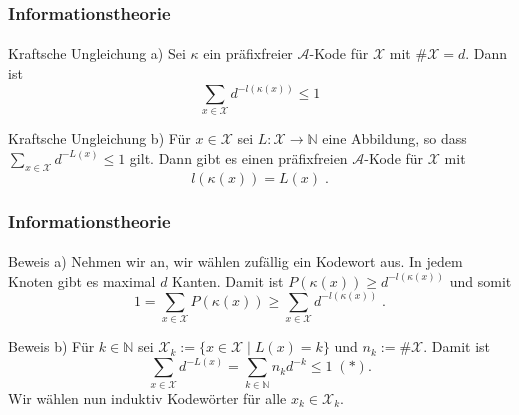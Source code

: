 \documentclass{beamer}
\begin{document}
\begin{frame}
    \frametitle{Informationstheorie}
\framesubtitle{}

\begin{block}{Kraftsche Ungleichung a)}
Sei $\kappa$ ein präfixfreier $\mathcal{A}$-Kode für $\mathcal{X}$ mit $\# \mathcal{X} = d$. Dann ist
$$ \sum_{x \in \mathcal{X} }  d^{-l( \kappa(x))} \leq 1$$
\end{block}

\begin{block}{Kraftsche Ungleichung b)}
Für $x \in \mathcal{X}$ sei $L : \mathcal{X} \to \mathbb{N}$ eine Abbildung, so dass $ \sum_{x \in \mathcal{X} }  d^{-L(x)} \leq 1$ gilt. Dann gibt es einen präfixfreien  $\mathcal{A}$-Kode für $\mathcal{X}$ mit 
$$ l(\kappa(x)) = L(x) \; .$$
\end{block}


 \end{frame}

\begin{frame}
    \frametitle{Informationstheorie}
\framesubtitle{}

\begin{block}{Beweis a)}
Nehmen wir an, wir wählen zufällig ein Kodewort aus.
In jedem Knoten gibt es maximal $d$ Kanten. Damit ist $P(\kappa(x)) \geq d^{-l(\kappa(x))}$ und somit
$$ 1 = \sum_{x \in \mathcal{X}} P(\kappa(x)) \geq  \sum_{x \in \mathcal{X}} d^{-l(\kappa(x))} \; .$$
\end{block}

\begin{block}{Beweis b)}
Für $k \in \mathbb{N}$ sei $\mathcal{X}_k := \{ x \in \mathcal{X} \;  |  \; L(x) = k\}$  und $n_k := \# \mathcal{X}$.
Damit ist 
$$  \sum_{x \in \mathcal{X} }  d^{-L(x)} =   \sum_{k \in \mathbb{N}}  n_k d^{-k} \leq 1\;(*) .$$
Wir wählen nun induktiv Kodewörter für alle $x_k \in \mathcal{X}_k$. 
\end{block}

 \end{frame}
\end{document}
